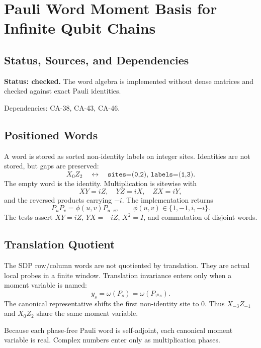 
\section{Pauli Word Moment Basis for Infinite Qubit Chains}
\label{sec:qubit-pauli-word-moment-basis}

\subsection{Status, Sources, and Dependencies}

\textbf{Status: checked.}  The word algebra is implemented without dense
matrices and checked against exact Pauli identities.

Dependencies: CA-38, CA-43, CA-46.


\subsection{Positioned Words}

A word is stored as sorted non-identity labels on integer sites.  Identities
are not stored, but gaps are preserved:
\[
  X_0Z_2\quad\leftrightarrow\quad
  \texttt{sites=(0,2), labels=(1,3)}.
\]
The empty word is the identity.  Multiplication is sitewise with
\[
  XY=iZ,\quad YZ=iX,\quad ZX=iY,
\]
and the reversed products carrying \(-i\).  The implementation returns
\[
  P_uP_v=\phi(u,v)P_{u\cdot v},
  \qquad \phi(u,v)\in\{1,-1,i,-i\}.
\]
The tests assert \(XY=iZ\), \(YX=-iZ\), \(X^2=I\), and commutation of disjoint
words.

\subsection{Translation Quotient}

The SDP row/column words are not quotiented by translation.  They are actual
local probes in a finite window.  Translation invariance enters only when a
moment variable is named:
\[
  y_s=\omega(P_s)=\omega(P_{\tau^n s}).
\]
The canonical representative shifts the first non-identity site to \(0\).
Thus \(X_{-3}Z_{-1}\) and \(X_0Z_2\) share the same moment variable.

Because each phase-free Pauli word is self-adjoint, each canonical moment
variable is real.  Complex numbers enter only as multiplication phases.
